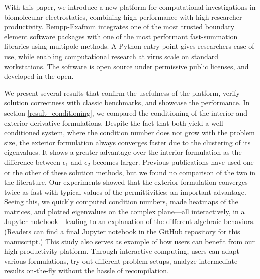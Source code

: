 With this paper, we introduce a new platform for computational investigations in biomolecular electrostatics, combining high-performance with high researcher productivity. 
Bempp-Exafmm integrates one of the most trusted boundary element software packages with one of the most performant fast-summation libraries using multipole methods. 
A Python entry point gives researchers ease of use, while enabling computational research at virus scale on standard workstations.
The software is open source under permissive public licenses, and developed in the open.

We present several results that confirm the usefulness of the platform, verify solution correctness with classic benchmarks, and showcase the performance. 
In section \ref{result_conditioning}, we compared the conditioning of the interior and exterior derivative formulations.
Despite the fact that both yield a well-conditioned system, where the condition number does not grow with the problem size, the exterior formulation always converges faster due to the clustering of its eigenvalues.
It shows a greater advantage over the interior formulation as the difference between $\epsilon_1$ and $\epsilon_2$ becomes larger.
Previous publications have used one or the other of these solution methods, but we found no comparison of the two in the literature.
Our experiments showed that the exterior formulation converges twice as fast with typical values of the permittivities: an important advantage.
Seeing this, we quickly computed condition numbers, made heatmaps of the matrices, and plotted eigenvalues on the complex plane---all interactively, in a Jupyter notebook---leading to an explanation of the different algebraic behaviors.
(Readers can find a final Jupyter notebook in the GitHub repository for this manuscript.)
This study also serves as example of how users can benefit from our high-productivity platform.
Through interactive computing, users can adapt various formulations, try out different problem setups, analyze intermediate results on-the-fly without the hassle of recompilation.

